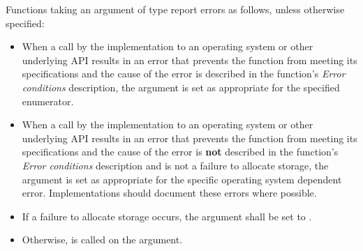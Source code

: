 \pnum
Functions taking an argument of type  report errors as follows, unless otherwise specified:

\begin{itemize}
\item When a call by the implementation to an operating system or other underlying API results in an error that prevents the function from meeting its specifications and the cause of the error is described in the function's \textit{Error conditions} description, the  argument is set as appropriate for the specified enumerator.

\item When a call by the implementation to an operating system or other underlying API results in an error that prevents the function from meeting its specifications and the cause of the error is \textbf{not} described in the function's \textit{Error conditions} description and is not a failure to allocate storage, the  argument is set as appropriate for the specific operating system dependent error. Implementations should document these errors where possible.

\item If a failure to allocate storage occurs, the  argument shall be set to .

\item Otherwise,  is called on the  argument.
\end{itemize}
